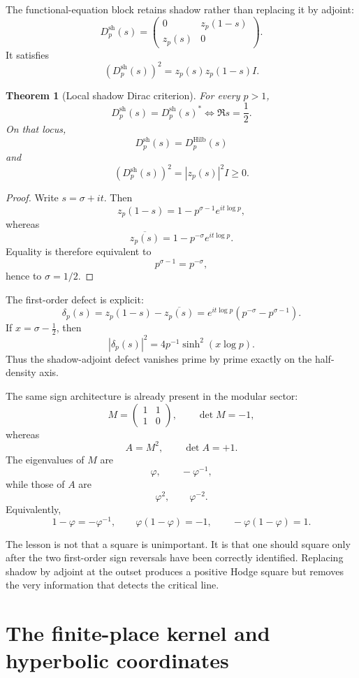 \documentclass[11pt]{article}
\newtheorem{theorem}{Theorem}[section]
\theoremstyle{definition}
\theoremstyle{remark}
\begin{document}
The functional-equation block retains shadow rather than replacing it by adjoint:
\[
\boxed{
D_p^{\mathrm{sh}}(s)
=
\begin{pmatrix}
0&z_p(1-s)\\
z_p(s)&0
\end{pmatrix}.
}
\]
It satisfies
\[
\left(D_p^{\mathrm{sh}}(s)\right)^2
=
z_p(s)z_p(1-s)I.
\]

\begin{theorem}[Local shadow Dirac criterion]
For every \(p>1\),
\[
\boxed{
D_p^{\mathrm{sh}}(s)
=
D_p^{\mathrm{sh}}(s)^*
\iff
\Re s=\frac12.
}
\]
On that locus,
\[
D_p^{\mathrm{sh}}(s)=D_p^{\mathrm{Hilb}}(s)
\]
and
\[
\left(D_p^{\mathrm{sh}}(s)\right)^2
=
|z_p(s)|^2I\ge0.
\]
\end{theorem}

\begin{proof}
Write \(s=\sigma+it\).  Then
\[
z_p(1-s)
=
1-p^{\sigma-1}e^{it\log p},
\]
whereas
\[
\overline{z_p(s)}
=
1-p^{-\sigma}e^{it\log p}.
\]
Equality is therefore equivalent to
\[
p^{\sigma-1}=p^{-\sigma},
\]
hence to \(\sigma=1/2\).
\end{proof}

The first-order defect is explicit:
\[
\delta_p(s)
=
z_p(1-s)-\overline{z_p(s)}
=
e^{it\log p}
\left(p^{-\sigma}-p^{\sigma-1}\right).
\]
If \(x=\sigma-\frac12\), then
\[
\boxed{
|\delta_p(s)|^2
=
4p^{-1}\sinh^2(x\log p).
}
\]
Thus the shadow-adjoint defect vanishes prime by prime exactly on the half-density axis.

The same sign architecture is already present in the modular sector:
\[
M=
\begin{pmatrix}
1&1\\
1&0
\end{pmatrix},
\qquad
\det M=-1,
\]
whereas
\[
A=M^2,\qquad \det A=+1.
\]
The eigenvalues of \(M\) are
\[
\varphi,\qquad -\varphi^{-1},
\]
while those of \(A\) are
\[
\varphi^2,\qquad\varphi^{-2}.
\]
Equivalently,
\[
1-\varphi=-\varphi^{-1},
\qquad
\varphi(1-\varphi)=-1,
\qquad
-\varphi(1-\varphi)=1.
\]

The lesson is not that a square is unimportant.  It is that one should square only after the two first-order sign reversals have been correctly identified.  Replacing shadow by adjoint at the outset produces a positive Hodge square but removes the very information that detects the critical line.

\section{The finite-place kernel and hyperbolic coordinates}
\end{document}
